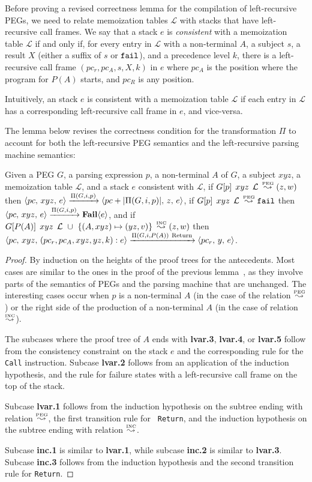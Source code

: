 Before proving a revised correctness lemma for the compilation of
left-recursive PEGs, we need to relate memoization tables
$\mathcal{L}$ with stacks that have left-recursive call frames. We say
that a stack $e$ is {\em consistent} with a memoization table
$\mathcal{L}$ if and only if, for every entry in $\mathcal{L}$ with a
non-terminal $A$, a subject $s$, a result $X$ (either a suffix of $s$
or $\Nothing$), and a precedence level $k$, there is a left-recursive
call frame $(pc_r,pc_A,s,X,k)$ in $e$ where $pc_A$ is the position
where the program for $P(A)$ starts, and $pc_R$ is any position.

Intuitively, an stack $e$ is consistent with a memoization table
$\mathcal{L}$ if each entry in $\mathcal{L}$ has a corresponding
left-recursive call frame in $e$, and vice-versa.

The lemma below revises the correctness condition for the
transformation $\Pi$ to account for both the left-recursive PEG
semantics and the left-recursive parsing machine semantics:
\begin{lemma}
Given a PEG $G$, a parsing expression $p$, a non-terminal $A$ of $G$, a subject $xyz$, a
memoization table $\mathcal{L}$, and a stack $e$ consistent with $\mathcal{L}$,
if $\Matgm{p}{xyz}{\mathcal{L}} \Lp (z,w)$ then $\Sstate{pc}{xyz}{e}
\xrightarrow{\Pi(G,i,p)} \Sstate{pc+|\Pi(G,i,p)|}{z}{e}$, if $\Matgm{p}{xyz}{\mathcal{L}} \Lp \Nothing$
then $\Sstate{pc}{xyz}{e} \xrightarrow{\Pi(G,i,p)} \Sfail{e}$, and if
$\Matgm{P(A)}{xyz}{\mathcal{L}\ \cup\ \{(A,xyz) \mapsto (yz,v)\}} \Li
(z,w)$ then $\Sstate{pc}{xyz}{(pc_r,pc_A,xyz,yz,k):e}
\xrightarrow{\Pi(G,i,P(A))\ \mathrm{Return}} \Sstate{pc_r}{y}{e}$.
\end{lemma}
\begin{proof}
By induction on the heights of the proof trees for the
antecedents. Most cases are similar to the ones in the proof of the
previous lemma~\cite{dls:lpeg}, as they involve parts of the semantics
of PEGs and the parsing machine that are unchanged. The interesting
cases occur when $p$ is a non-terminal $A$ (in the case of the
relation $\Lp$) or the right side of the production of a non-terminal
$A$ (in the case of relation $\Li$).

The subcases where the proof tree of $A$ ends with {\bf lvar.3}, {\bf
  lvar.4}, or {\bf lvar.5} follow from the consistency constraint on
the stack $e$ and the corresponding rule for the {\tt Call}
instruction. Subcase {\bf lvar.2} follows from an application of the
induction hypothesis, and the rule for failure states with a
left-recursive call frame on the top of the stack.

Subcase {\bf lvar.1} follows from the induction hypothesis on the
subtree ending with relation $\Lp$, the first transition rule for {\tt
  Return}, and the induction hypothesis on the subtree ending with
relation $\Li$.

Subcase {\bf inc.1} is similar to {\bf lvar.1}, while subcase {\bf
  inc.2} is similar to {\bf lvar.3}. Subcase {\bf inc.3} follows from
the induction hypothesis and the second transition rule for {\tt Return}.
\end{proof}

